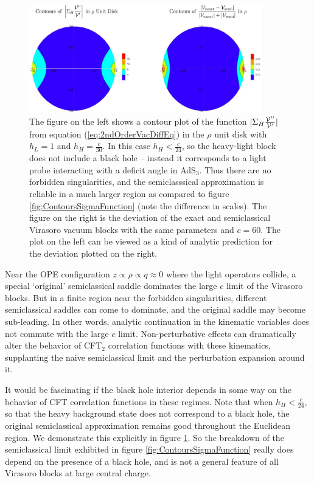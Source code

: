 \documentclass[12pt]{article}
\numberwithin{equation}{section}
\newcommand{\CV}{{\cal V}}
\begin{document}
\begin{figure}
\centering{}\includegraphics[width=0.9\textwidth]{NoBHContours}
\caption{The figure on the left shows a contour plot of the function $|\Sigma_{H} \frac{\CV''}{\CV'}|$ from equation (\ref{eq:2ndOrderVacDiffEq}) in the $\rho$ unit disk with $h_L = 1$ and $h_H = \frac{c}{30}$.  In this case $h_H < \frac{c}{24}$, so the heavy-light block does not include a black hole -- instead it corresponds to a light probe interacting with a deficit angle in AdS$_3$.  Thus there are no forbidden singularities, and the semiclasssical approximation is reliable in a much larger region as compared to figure \ref{fig:ContoursSigmaFunction} (note the difference in scales).  The figure on the right is the deviation of the exact and semiclassical Virasoro vacuum blocks with the same parameters and $c = 60$.  The plot on the left can be viewed as a kind of analytic prediction for the deviation plotted on the right. }
\label{fig:NoBHContours}
\end{figure}

Near the OPE configuration $z \propto \rho \propto q \approx 0$ where the light operators collide, a special `original' semiclassical saddle dominates the large $c$ limit \cite{Fitzpatrick:2016ive} of the Virasoro blocks.  But in a finite region near the forbidden singularities, different semiclassical saddles \cite{Fitzpatrick:2016mjq} can come to dominate, and the original saddle may become sub-leading.  In other words, analytic continuation in the kinematic variables does not commute with the large $c$ limit.  Non-perturbative effects can dramatically alter the behavior of CFT$_2$ correlation functions with these kinematics, supplanting the naive semiclassical limit and the perturbation expansion around it.  

It would be fascinating if the black hole interior depends in some way on the behavior of CFT correlation functions in these regimes.  Note that when $h_H < \frac{c}{24}$, so that the heavy background state does not correspond to a black hole, the original semiclassical approximation remains good throughout the Euclidean region. We demonstrate this explicitly in figure \ref{fig:NoBHContours}.  So the breakdown of the semiclassical limit exhibited in figure \ref{fig:ContoursSigmaFunction} really does depend on the presence of a black hole, and is not a general feature of all Virasoro blocks at large central charge.
\end{document}
